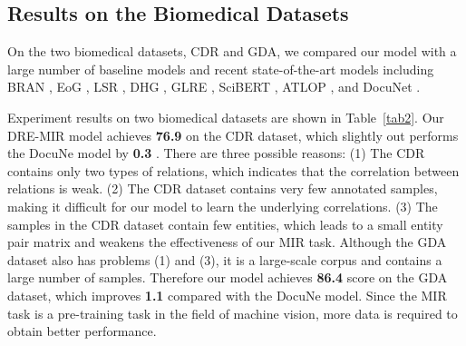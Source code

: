 \documentclass{article}
\begin{document}
\begin{table*}[th]
\begin{table}[]
\centering
{}
\caption{
Ablation study of the DRE-MIR model on the development set of the DocRED. 
\textbf{w/o Inference Model} and \textbf{w/o MIR} removes the Inference Model and the MIR task from our mode, respectively;
\textbf{w/o I-MSA} replaces the Inference Multi-head Self-Attention (I-MSA) with the multi-head self-attention (MSA);
\textbf{w/o Inference Model} is our base model.
}
\label{tab3} 
\end{table}


\subsection{Results on the Biomedical Datasets}
On the two biomedical datasets, CDR and GDA, we compared our model with a large number of baseline models and recent state-of-the-art models including BRAN \cite{c:9}, EoG \cite{c:15}, LSR \cite{c:14}, DHG \cite{c:40}, GLRE \cite{c:16}, SciBERT \cite{c:31}, ATLOP \cite{c:11}, and DocuNet \cite{c:13}.


Experiment results on two biomedical datasets are shown in Table~\ref{tab2}.
Our DRE-MIR model achieves \textbf{76.9}  on the CDR dataset, which slightly out performs the DocuNe model by \textbf{0.3} .
There are three possible reasons: (1) The CDR contains only two types of relations, which indicates that the correlation between relations is weak.
(2) The CDR dataset contains very few annotated samples, making it difficult for our model to learn the underlying correlations. 
(3) The samples in the CDR dataset contain few entities, which leads to a small entity pair matrix and weakens the effectiveness of our MIR task.
Although the GDA dataset also has problems (1) and (3), it is a large-scale corpus and contains a large number of samples. Therefore our model achieves \textbf{86.4}  score on the GDA dataset, which improves
\textbf{1.1}  compared with the DocuNe model.
Since the MIR task is a pre-training task in the field of machine vision, more data is required to obtain better performance.





\end{table*}
\end{document}
